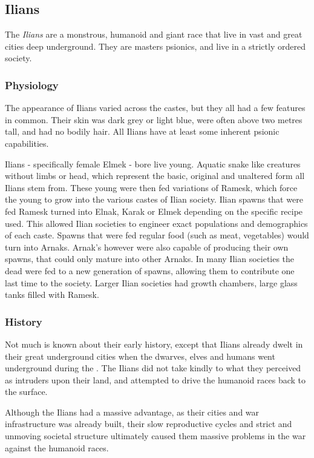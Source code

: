 \subsection{Ilians}
\label{sec:Ilians}

The \emph{Ilians} are a monstrous, humanoid and giant race that live in vast
and great cities deep underground. They are masters psionics, and live in a
strictly ordered society.

\subsubsection{Physiology}

The appearance of Ilians varied across the castes, but they all had a few
features in common. Their skin was dark grey or light blue, were often above
two metres tall, and had no bodily hair. All Ilians have at least some
inherent psionic capabilities.

Ilians - specifically female Elmek - bore live young. Aquatic snake like
creatures without limbs or head, which represent the basic, original and
unaltered form all Ilians stem from. These young were then fed variations of
Ramesk, which force the young to grow into the various castes of Ilian
society. Ilian spawns that were fed Ramesk turned into Elnak, Karak or Elmek
depending on the specific recipe used. This allowed Ilian societies to
engineer exact populations and demographics of each caste. Spawns that were
fed regular food (such as meat, vegetables) would turn into Arnaks. Arnak's
however were also capable of producing their own spawns, that could only
mature into other Arnaks. In many Ilian societies the dead were fed to a new
generation of spawns, allowing them to contribute one last time to the
society. Larger Ilian societies had growth chambers, large glass tanks filled
with Ramesk.

\subsubsection{History}

Not much is known about their early history, except that Ilians already dwelt
in their great underground cities when the dwarves, elves and humans went
underground during the . The Ilians did not take kindly to
what they perceived as intruders upon their land, and attempted to drive the
humanoid races back to the surface.

Although the Ilians had a massive advantage, as their cities and war
infrastructure was already built, their slow reproductive cycles and strict
and unmoving societal structure ultimately caused them massive problems in
the war against the humanoid races.

